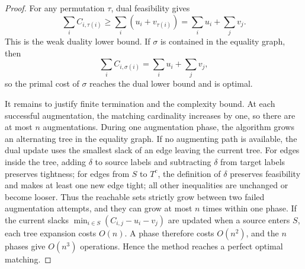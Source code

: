 \begin{proof}
	For any permutation $\tau$, dual feasibility gives
	\[
		\sum_i C_{i,\tau(i)} \geq \sum_i (u_i+v_{\tau(i)})
		= \sum_i u_i+\sum_j v_j.
	\]
	This is the weak duality lower bound. If $\sigma$ is contained in the equality graph, then
	\[
		\sum_i C_{i,\sigma(i)}
		= \sum_i u_i+\sum_j v_j,
	\]
	so the primal cost of $\sigma$ reaches the dual lower bound and is optimal.

	It remains to justify finite termination and the complexity bound. At each successful augmentation, the matching cardinality increases by one, so there are at most $n$ augmentations. During one augmentation phase, the algorithm grows an alternating tree in the equality graph. If no augmenting path is available, the dual update uses the smallest slack of an edge leaving the current tree. For edges inside the tree, adding $\delta$ to source labels and subtracting $\delta$ from target labels preserves tightness; for edges from $S$ to $T^c$, the definition of $\delta$ preserves feasibility and makes at least one new edge tight; all other inequalities are unchanged or become looser. Thus the reachable sets strictly grow between two failed augmentation attempts, and they can grow at most $n$ times within one phase. If the current slacks $\min_{i\in S}(C_{i,j}-u_i-v_j)$ are updated when a source enters $S$, each tree expansion costs $O(n)$. A phase therefore costs $O(n^2)$, and the $n$ phases give $O(n^3)$ operations. Hence the method reaches a perfect optimal matching.
\end{proof}
